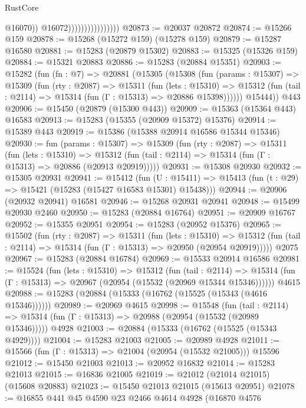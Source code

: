 \begin{lexlean}{RustCore}
\begin{coremodule}
                                        @16070))
                                    @16072))))))))))))))))
@20873 := @20037 @20872
@20874 := @15266 @159
@20878 := @15268 (@15272 @159) (@15278 @159)
@20879 := @15287 @16580
@20881 := @15283 (@20879 @15302)
@20883 := @15325 (@15326 @159)
@20884 := @15321 @20883
@20886 := @15283 (@20884 @15351)
@20903 := @15282
    (fun (fn : @7) =>
    @20881
      (@15305
        (@15308
          (fun (params : @15307) =>
          @15309
            (fun (rty : @2087) =>
            @15311
              (fun (lets : @15310) =>
              @15312 (fun (tail : @2114) => @15314 (fun (Γ : @15313) => @20886 @15398))))))
        @15444))
    @443
@20906 := @15450 (@20879 (@15300 @443))
@20909 := @15363 (@15364 @443) @16583
@20913 := @15283 (@15355 (@20909 @15372) @15376)
@20914 := @15389 @443
@20919 := @15386 (@15388 @20914 @16586 @15344 @15346)
@20930 := fun (params : @15307) =>
  @15309
    (fun (rty : @2087) =>
    @15311
      (fun (lets : @15310) =>
      @15312 (fun (tail : @2114) => @15314 (fun (Γ : @15313) => @20886 (@20913 @20919)))))
@20931 := @15308 @20930
@20932 := @15305 @20931
@20941 := @15412
    (fun (U : @15411) => @15413 (fun (t : @29) => @15421 (@15283 (@15427 @16583 @15301) @15438)))
@20944 := @20906 (@20932 @20941) @16581
@20946 := @15268 @20931 @20941
@20948 := @15499 @20930 @2460
@20950 := @15283 (@20884 @16764)
@20951 := @20909 @16767
@20952 := @15355 @20951
@20954 := @15283 (@20952 @15376)
@20965 := @15502
    (fun (rty : @2087) =>
    @15311
      (fun (lets : @15310) =>
      @15312 (fun (tail : @2114) => @15314 (fun (Γ : @15313) => @20950 (@20954 @20919)))))
    @2075
@20967 := @15283 (@20884 @16784)
@20969 := @15533 @20914 @16586
@20981 := @15524
    (fun (lets : @15310) =>
    @15312
      (fun (tail : @2114) =>
      @15314 (fun (Γ : @15313) => @20967 (@20954 (@15532 (@20969 @15344 @15346))))))
    @4615
@20988 := @15283 (@20884 (@15333 (@16762 (@15525 (@15343 (@4616 @15346))))))
@20989 := @20969 @4615
@20998 := @15548
    (fun (tail : @2114) => @15314 (fun (Γ : @15313) => @20988 (@20954 (@15532 (@20989 @15346)))))
    @4928
@21003 := @20884 (@15333 (@16762 (@15525 (@15343 @4929))))
@21004 := @15283 @21003
@21005 := @20989 @4928
@21011 := @15566 (fun (Γ : @15313) => @21004 (@20954 (@15532 @21005))) @15596
@21012 := @15450 @21003
@21013 := @20952 @16832
@21014 := @15283 @21013
@21015 := @16836 @21005
@21019 := @21012 (@21014 @21015) (@15608 @20883)
@21023 := @15450 @21013 @21015 (@15613 @20951)
@21078 := @16855
    @441
    @45
    @4590
    @23
    @2466
    @4614
    @4928
    (@16870
      @4576

\end{coremodule}
\end{lexlean}
